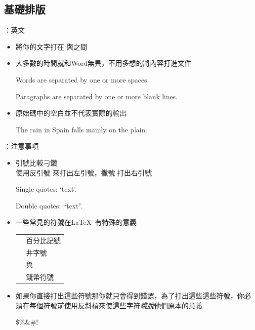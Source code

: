 \documentclass{beamer}
\begin{document}
\subsection{基礎排版}
\begin{frame}[fragile]{\insertsubsection{}：英文}
\small
\begin{itemize}
\item 將你的文字打在 與之間
\item 大多數的時間就和Word無異，不用多想的將內容打進文件%
\begin{exampletwouptiny}
Words are separated by one or more
spaces.

Paragraphs are separated by one
or more blank lines.
\end{exampletwouptiny}
\item 原始碼中的空白並不代表實際的輸出
\begin{exampletwouptiny}
The   rain       in Spain
falls mainly on the plain.
\end{exampletwouptiny}
\end{itemize}
\end{frame}

\begin{frame}[fragile]{\insertsubsection{}：注意事項}
\small
\begin{itemize}
\item 引號比較刁鑽\\
使用反引號 \keystroke{\`{}}來打出左引號，撇號 \keystroke{\'{}}打出右引號
\begin{exampletwouptiny}
Single quotes: `text'.

Double quotes: ``text''.
\end{exampletwouptiny}

\item 一些常見的符號在\LaTeX\ 有特殊的意義\\[1ex]
\begin{tabular}{cl}
\keystrokebftt{\%} & 百分比記號              \\
\keystrokebftt{\#} & 井字號 \\
\keystrokebftt{\&} & 與                 \\
\keystrokebftt{\$} & 錢幣符號               \\
\end{tabular}
\item 如果你直接打出這些符號那你就只會得到錯誤，為了打出這些這些符號，你必須在每個符號前使用反斜槓來使這些字符\emph{跳脫}他們原本的意義 
\begin{exampletwoup}
\$\%\&\#!
\end{exampletwoup}
\end{itemize}
\end{frame}
\end{document}
